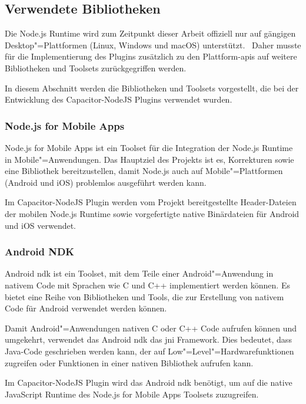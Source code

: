 \subsection{Verwendete Bibliotheken}

Die Node.js Runtime wird zum Zeitpunkt dieser Arbeit offiziell nur auf gängigen Desktop"=Plattformen (Linux, Windows und macOS) unterstützt.~\cite{nodejs}
Daher musste für die Implementierung des Plugins zusätzlich zu den Plattform-\acsp{api} auf weitere Bibliotheken und Toolsets zurückgegriffen werden.

In diesem Abschnitt werden die Bibliotheken und Toolsets vorgestellt, die bei der Entwicklung des Capacitor-NodeJS Plugins verwendet wurden.

\subsubsection{Node.js for Mobile Apps}

Node.js for Mobile Apps ist ein Toolset für die Integration der Node.js Runtime in Mobile"=Anwendungen.
Das Hauptziel des Projekts ist es, Korrekturen sowie eine Bibliothek bereitzustellen, damit Node.js auch auf Mobile"=Plattformen (Android und iOS) problemlos ausgeführt werden kann.
\cite{nodejs-mobile, nodejs-mobile:docs}

Im Capacitor-NodeJS Plugin werden vom Projekt bereitgestellte Header-Dateien der mobilen Node.js Runtime sowie vorgefertigte native Binärdateien für Android und iOS verwendet.

\subsubsection{Android NDK}

Android \ac{ndk} ist ein Toolset, mit dem Teile einer Android"=Anwendung in nativem Code mit Sprachen wie C und C++ implementiert werden können.
Es bietet eine Reihe von Bibliotheken und Tools, die zur Erstellung von nativem Code für Android verwendet werden können.
\cite{android:ndk}

Damit Android"=Anwendungen nativen C oder C++ Code aufrufen können und umgekehrt, verwendet das Android \ac{ndk} das \ac{jni} Framework.
Dies bedeutet, dass Java-Code geschrieben werden kann, der auf Low"=Level"=Hardwarefunktionen zugreifen oder Funktionen in einer nativen Bibliothek aufrufen kann.
\cite{android:ndk}

Im Capacitor-NodeJS Plugin wird das Android \ac{ndk} benötigt, um auf die native JavaScript Runtime des Node.js for Mobile Apps Toolsets zuzugreifen.
\cite{nodejs-mobile:docs}
